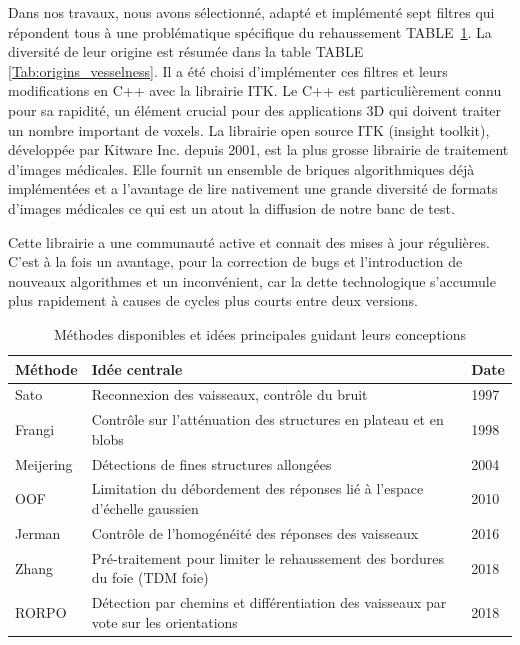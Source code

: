 Dans nos travaux, nous avons sélectionné, adapté et implémenté sept filtres qui répondent tous à une problématique spécifique du rehaussement TABLE~\ref{Tab:available_vesselness}. La diversité de leur origine est résumée dans la table TABLE~ \ref{Tab:origins_vesselness}. Il a été choisi d'implémenter ces filtres et leurs modifications en C++ avec la librairie ITK. Le C++ est particulièrement connu pour sa rapidité, un élément crucial pour des applications 3D qui doivent traiter un nombre important de voxels. La librairie open source ITK (insight toolkit), développée par Kitware Inc. depuis 2001, est la plus grosse librairie de traitement d'images médicales. Elle fournit un ensemble de briques algorithmiques déjà implémentées et a l'avantage de lire nativement une grande diversité de formats d'images médicales ce qui est un atout la diffusion de notre banc de test.

Cette librairie a une communauté active et connait des mises à jour régulières. C'est à la fois un avantage, pour la correction de bugs et l'introduction de nouveaux algorithmes et un inconvénient, car la dette technologique s'accumule plus rapidement à causes de cycles plus courts entre deux versions.

\begin{table}
    \begin{center}
  \begin{tabular}{l|l|l}
  Méthode   &  Idée centrale                                                                       & Date \\ \hline  \hline 
  Sato      & Reconnexion des vaisseaux, contrôle du bruit                                         & 1997 \\ \hline
  Frangi    & Contrôle sur l'atténuation des structures en plateau et en blobs                     & 1998 \\ \hline
  Meijering & Détections de fines structures allongées                                             & 2004 \\ \hline
  OOF       & Limitation du débordement des réponses lié à l'espace d'échelle gaussien             & 2010 \\ \hline
  Jerman    & Contrôle de l'homogénéité des réponses des vaisseaux                                 & 2016 \\ \hline
  Zhang     & Pré-traitement pour limiter le rehaussement des bordures du foie (TDM foie)          & 2018 \\ \hline
  RORPO     & Détection par chemins et différentiation des vaisseaux par vote sur les orientations & 2018  
  \end{tabular}
  \end{center}
  \caption{Méthodes disponibles et idées principales guidant leurs conceptions}
  \label{Tab:available_vesselness}
  \end{table}

